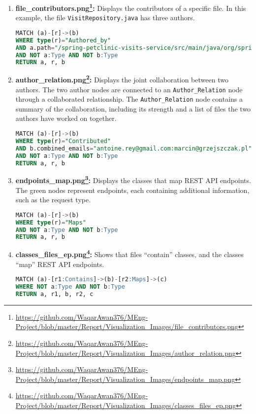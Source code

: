 \begin{enumerate}[before={\vspace{10pt}}, after={\vspace{10pt}}, itemsep=10pt, nosep, leftmargin=\parindent, labelindent=0pt]
\item \textbf{file\_contributors.png\footnote{\url{https://github.com/WaqarAwan376/MEng-Project/blob/master/Report/Visualization_Images/file_contributors.png}}:} Displays the contributors of a specific file. In this example, the file \texttt{VisitRepository.java} has three authors.
\begin{lstlisting}[language=SQL]
MATCH (a)-[r]->(b)
WHERE type(r)="Authored_by"
AND a.path="/spring-petclinic-visits-service/src/main/java/org/springframework/samples/petclinic/visits/model/VisitRepository.java"
AND NOT a:Type AND NOT b:Type
RETURN a, r, b
\end{lstlisting}
\vspace{10pt}

\item \textbf{author\_relation.png\footnote{\url{https://github.com/WaqarAwan376/MEng-Project/blob/master/Report/Visualization_Images/author_relation.png}}:} Displays the joint collaboration between two authors. The two author nodes are connected to an \texttt{Author\_Relation} node through a collaborated relationship. The \texttt{Author\_Relation} node contains a summary of the collaboration, including its strength and a list of files the two authors have worked on together.
\begin{lstlisting}[language=SQL]
MATCH (a)-[r]->(b)
WHERE type(r)="Contributed"
AND b.combined_emails="antoine.rey@gmail.com:marcin@grzejszczak.pl"
AND NOT a:Type AND NOT b:Type
RETURN a, r, b
\end{lstlisting}
\vspace{10pt}

\item \textbf{endpoints\_map.png\footnote{\url{https://github.com/WaqarAwan376/MEng-Project/blob/master/Report/Visualization_Images/endpoints_map.png}}:} Displays the classes that map REST API endpoints. The green nodes represent endpoints, each containing additional information, such as the request type.
\begin{lstlisting}[language=SQL]
MATCH (a)-[r]->(b)
WHERE type(r)="Maps"
AND NOT a:Type AND NOT b:Type
RETURN a, r, b
\end{lstlisting}
\vspace{10pt}

\item \textbf{classes\_files\_ep.png\footnote{\url{https://github.com/WaqarAwan376/MEng-Project/blob/master/Report/Visualization_Images/classes_files_ep.png}}:} Shows that files ``contain'' classes, and the classes ``map'' REST API endpoints.
\begin{lstlisting}[language=SQL]
MATCH (a)-[r1:Contains]->(b)-[r2:Maps]->(c)
WHERE NOT a:Type AND NOT b:Type
RETURN a, r1, b, r2, c
\end{lstlisting}
\vspace{10pt}


\end{enumerate}
